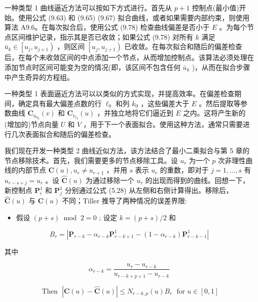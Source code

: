 \documentclass[../main.tex]{subfiles}
\begin{document}
一种类型 1 曲线逼近方法可以按如下方式进行。首先从 \(p + 1\) 控制点(最小值)开始。使用公式 (9.63) 和 (9.65) (9.67) 拟合曲线，或者如果需要内部约束，则使用算法 A9.6。在每次拟合后，使用公式 (9.78) 检查曲线偏差是否小于 \(E\) 。为每个节点区间维护记录，指示其是否已收敛；如果公式 (9.78) 对所有 \(k\) 满足 \({\bar{u}}_{k} \in  \left\lbrack  {{u}_{j},{u}_{j + 1}}\right)\) ，则区间 \(\left\lbrack  {{u}_{j},{u}_{j + 1}}\right)\) 已收敛。在每次拟合和随后的偏差检查后，在每个未收敛区间的中点添加一个节点，从而增加控制点。该算法必须处理在添加节点时区间可能变为空的情况(即，该区间不包含任何 \({\bar{u}}_{k}\) )，从而在拟合步骤中产生奇异的方程组。

一种类型 1 表面逼近方法可以以类似的方式实现，并提高效率。在偏差检查期间，确定具有最大偏差点数的行 \({\ell }_{0}\) 和列 \({k}_{0}\) ，这些偏差大于 \(E\) 。然后提取等参数曲线 \({\mathbf{C}}_{{\bar{u}}_{{k}_{0}}}\left( v\right)\) 和 \({\mathbf{C}}_{{\bar{v}}_{{\ell }_{0}}}\left( u\right)\) ，并独立地将它们逼近到 \(E\) 之内。这将产生新的(增加的)节点向量 \(U\) 和 \(V\) ，用于下一个表面拟合。使用这种方法，通常只需要进行几次表面拟合和随后的偏差检查。

我们现在开发一种类型 2 曲线近似方法，该方法结合了最小二乘拟合与第 5 章的节点移除技术。首先，我们需要更多的节点移除工具。设 \({u}_{r}\) 为一个 \(p\) 次非理性曲线的内部节点 \(\mathbf{C}\left( u\right) ,{u}_{r} \neq  {u}_{r + 1}\) ，并用 \(s\) 表示 \({u}_{r}\) 的重数，即对于 \(j = 1,\ldots ,s\) 有 \({u}_{r - s + j} = {u}_{r}\) 。设 \(\widehat{\mathbf{C}}\left( u\right)\) 为通过移除一个 \({u}_{r}\) 的出现而得到的曲线。回想一下，新控制点 \({\mathbf{P}}_{i}^{1}\) 和 \({\mathbf{P}}_{j}^{1}\) 分别通过公式 (5.28) 从左侧和右侧计算得出。移除后， \(\widehat{\mathbf{C}}\left( u\right)\) 与 \(\mathbf{C}\left( u\right)\) 不同；Tiller \cite{Till92} 推导了两种情况的误差界限:

\begin{itemize}
\item 假设 \(\left( {p + s}\right) {\;\operatorname{mod}\;2} = 0\) ; 设定 \(k = \left( {p + s}\right) /2\) 和
\end{itemize}

\[
{B}_{r} = \left| {{\mathbf{P}}_{r - k} - {\alpha }_{r - k}{\mathbf{P}}_{r - k + 1}^{1} - \left( {1 - {\alpha }_{r - k}}\right) {\mathbf{P}}_{r - k - 1}^{1}}\right|  \tag{9.80}
\]

其中

\[
{\alpha }_{r - k} = \frac{{u}_{r} - {u}_{r - k}}{{u}_{r - k + p + 1} - {u}_{r - k}}
\]

\[
\text{ Then }\;\left| {\mathbf{C}\left( u\right)  - \widehat{\mathbf{C}}\left( u\right) }\right|  \leq  {N}_{r - k,p}\left( u\right) {B}_{r}\;\text{ for }u \in  \left\lbrack  {0,1}\right\rbrack   \tag{9.81}
\]
\end{document}
